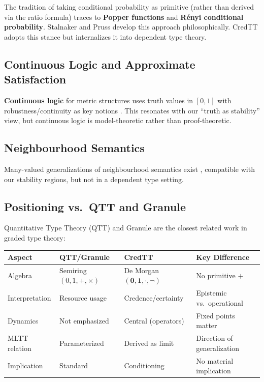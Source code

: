 \documentclass[11pt,a4paper]{article}
\newcommand{\one}{\mathbf{1}}
\newcommand{\zero}{\mathbf{0}}
\newcommand{\negc}{\neg}
\begin{document}
The tradition of taking conditional probability as primitive (rather than derived via the ratio formula) traces to \textbf{Popper functions} and \textbf{R\'enyi conditional probability}. Stalnaker \citep{stalnaker1970probability} and Pruss \citep{pruss2013popper} develop this approach philosophically. CredTT adopts this stance but internalizes it into dependent type theory.

\subsection{Continuous Logic and Approximate Satisfaction}

\textbf{Continuous logic} for metric structures uses truth values in $[0,1]$ with robustness/continuity as key notions \citep{benyaacov2008continuous}. This resonates with our ``truth as stability'' view, but continuous logic is model-theoretic rather than proof-theoretic.

\subsection{Neighbourhood Semantics}

Many-valued generalizations of neighbourhood semantics exist \citep{hansoul2020neighbourhood}, compatible with our stability regions, but not in a dependent type setting.

\subsection{Positioning vs.\ QTT and Granule}

Quantitative Type Theory (QTT) \citep{atkey2018syntax} and Granule \citep{orchard2019quantitative} are the closest related work in graded type theory:

\begin{center}
\begin{tabular}{l|l|l|l}
\textbf{Aspect} & \textbf{QTT/Granule} & \textbf{CredTT} & \textbf{Key Difference} \\
\hline
Algebra & Semiring $(0,1,+,\times)$ & De Morgan $(\zero,\one,\cdot,\negc)$ & No primitive $+$ \\
Interpretation & Resource usage & Credence/certainty & Epistemic vs.\ operational \\
Dynamics & Not emphasized & Central (operators) & Fixed points matter \\
MLTT relation & Parameterized & Derived as limit & Direction of generalization \\
Implication & Standard & Conditioning & No material implication \\
\end{tabular}
\end{center}
\end{document}
